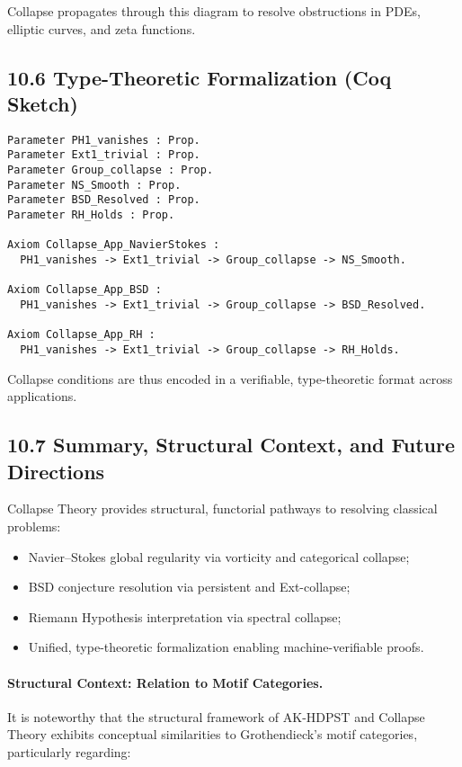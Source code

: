\documentclass[11pt]{article}
\begin{document}
Collapse propagates through this diagram to resolve obstructions in PDEs, elliptic curves, and zeta functions.

\subsection*{10.6 Type-Theoretic Formalization (Coq Sketch)}

\begin{lstlisting}[language=Coq]
Parameter PH1_vanishes : Prop.
Parameter Ext1_trivial : Prop.
Parameter Group_collapse : Prop.
Parameter NS_Smooth : Prop.
Parameter BSD_Resolved : Prop.
Parameter RH_Holds : Prop.

Axiom Collapse_App_NavierStokes :
  PH1_vanishes -> Ext1_trivial -> Group_collapse -> NS_Smooth.

Axiom Collapse_App_BSD :
  PH1_vanishes -> Ext1_trivial -> Group_collapse -> BSD_Resolved.

Axiom Collapse_App_RH :
  PH1_vanishes -> Ext1_trivial -> Group_collapse -> RH_Holds.
\end{lstlisting}

Collapse conditions are thus encoded in a verifiable, type-theoretic format across applications.

\subsection*{10.7 Summary, Structural Context, and Future Directions}

Collapse Theory provides structural, functorial pathways to resolving classical problems:

\begin{itemize}
    \item Navier–Stokes global regularity via vorticity and categorical collapse;
    \item BSD conjecture resolution via persistent and Ext-collapse;
    \item Riemann Hypothesis interpretation via spectral collapse;
    \item Unified, type-theoretic formalization enabling machine-verifiable proofs.
\end{itemize}

\paragraph{Structural Context: Relation to Motif Categories.}

It is noteworthy that the structural framework of AK-HDPST and Collapse Theory exhibits conceptual similarities to Grothendieck's motif categories, particularly regarding:
\end{document}
